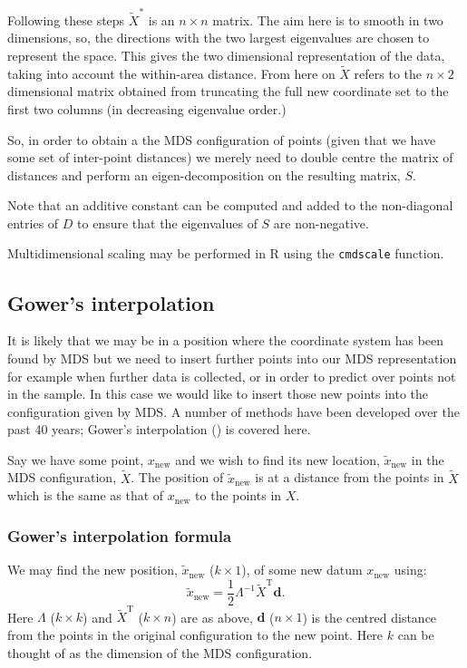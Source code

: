 \documentclass[a4paper,10pt]{article}
\newcommand{\tr}[1]{#1^{\text{T}}}
\newcommand{\cross}{\times}
\begin{document}
Following these steps $\tilde{X}^*$ is an $n \cross n$ matrix. The aim here is to smooth in two dimensions, so, the directions with the two largest eigenvalues are chosen to represent the space. This gives the two dimensional representation of the data, taking into account the within-area distance. From here on $\tilde{X}$ refers to the $n \cross 2$ dimensional matrix obtained from truncating the full new coordinate set to the first two columns (in decreasing eigenvalue order.)

So, in order to obtain a the MDS configuration of points (given that we have some set of inter-point distances) we merely need to double centre the matrix of distances and perform an eigen-decomposition on the resulting matrix, $S$. 

Note that an additive constant can be computed and added to the non-diagonal entries of $D$ to ensure that the eigenvalues of $S$ are non-negative.

Multidimensional scaling may be performed in \textsf{R} using the \texttt{cmdscale} function. 

\subsection{Gower's interpolation} 

It is likely that we may be in a position where the coordinate system has been found by MDS but we need to insert further points into our MDS representation for example when further data is collected, or in order to predict over points not in the sample. In this case we would like to insert those new points into the configuration given by MDS. A number of methods have been developed over the past 40 years; Gower's interpolation (\cite{gower1968}) is covered here.

Say we have some point, $x_{\text{new}}$ and we wish to find its new location, $\tilde{x}_{\text{new}}$ in the MDS configuration, $\tilde{X}$. The position of $\tilde{x}_{\text{new}}$ is at a distance from the points in $\tilde{X}$ which is the same as that of $x_{\text{new}}$ to the points in $X$. 

\subsubsection{Gower's interpolation formula}

We may find the new position, $\tilde{x}_{\text{new}}$ ($k \cross 1$), of some new datum $x_{\text{new}}$ using:
\begin{equation}
\tilde{x}_{\text{new}} = \frac{1}{2} \Lambda^{-1} \tr{\tilde{X}} \mathbf{d}.
\label{gower}
\end{equation}
Here $\Lambda$ ($k \cross k$) and $\tr{\tilde{X}}$ ($k \cross n$) are as above, $\mathbf{d}$ ($n \cross 1$) is the centred distance from the points in the original configuration to the new point. Here $k$ can be thought of as the dimension of the MDS configuration.
\end{document}

